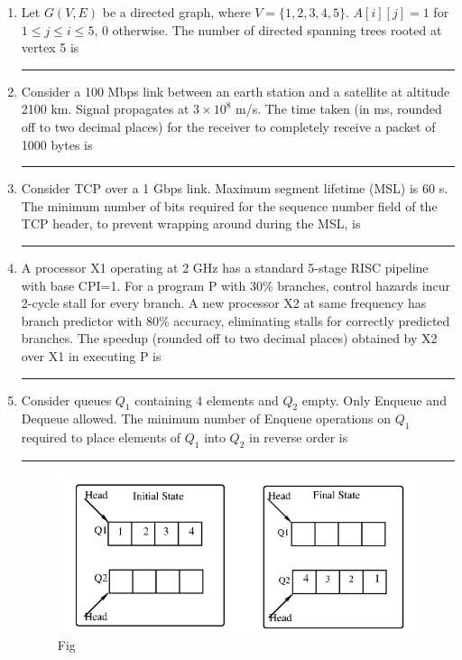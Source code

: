 \begin{enumerate}
\item Let $G(V,E)$ be a directed graph, where $V=\{1,2,3,4,5\}$. $A[i][j]=1$ for $1\leq j \leq i \leq 5$, 0 otherwise. The number of directed spanning trees rooted at vertex 5 is \rule{2cm}{0.4pt}  

\hfill{}

\item Consider a 100 Mbps link between an earth station and a satellite at altitude 2100 km. Signal propagates at $3 \times 10^8$ m/s. The time taken (in ms, rounded off to two decimal places) for the receiver to completely receive a packet of 1000 bytes is \rule{2cm}{0.4pt}  

\hfill{}

\item Consider TCP over a 1 Gbps link. Maximum segment lifetime (MSL) is 60 s. The minimum number of bits required for the sequence number field of the TCP header, to prevent wrapping around during the MSL, is \rule{2cm}{0.4pt}  

\hfill{}

\item A processor X1 operating at 2 GHz has a standard 5-stage RISC pipeline with base CPI=1. For a program P with 30\% branches, control hazards incur 2-cycle stall for every branch. A new processor X2 at same frequency has branch predictor with 80\% accuracy, eliminating stalls for correctly predicted branches. The speedup (rounded off to two decimal places) obtained by X2 over X1 in executing P is \rule{2cm}{0.4pt}  

\hfill{}

\item Consider queues $Q_1$ containing 4 elements and $Q_2$ empty. Only Enqueue and Dequeue allowed. The minimum number of Enqueue operations on $Q_1$ required to place elements of $Q_1$ into $Q_2$ in reverse order is \rule{2cm}{0.4pt}  
\begin{figure}[H]
\centering
\includegraphics[width=0.8\columnwidth]{figs/q62.png}
\caption{Fig}
\label{fig:q62}
\end{figure}
\hfill{}


\end{enumerate}

